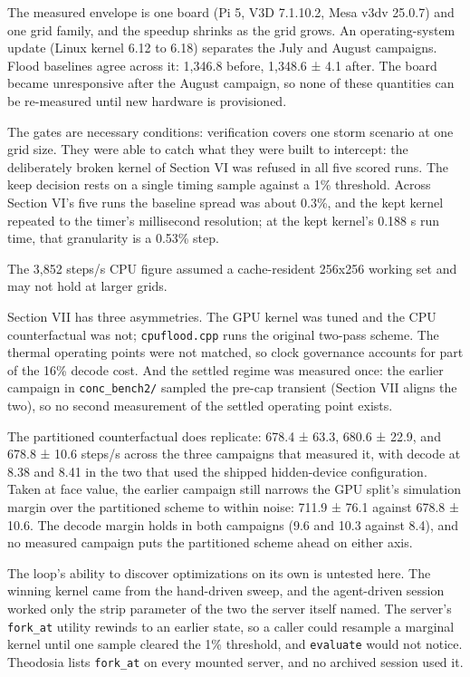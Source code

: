 \documentclass[conference]{IEEEtran}
\begin{document}
The measured envelope is one board (Pi 5, V3D 7.1.10.2, Mesa v3dv
25.0.7) and one grid family, and the speedup shrinks as the grid grows.
An operating-system update (Linux kernel 6.12 to 6.18) separates the
July and August campaigns. Flood baselines agree across it: 1,346.8
before, 1,348.6 ± 4.1 after. The board became unresponsive after the
August campaign, so none of these quantities can be re-measured until
new hardware is provisioned.

The gates are necessary conditions: verification covers one storm
scenario at one grid size. They were able to catch what they were built
to intercept: the deliberately broken kernel of Section VI was refused
in all five scored runs. The keep decision rests on a single timing
sample against a 1\% threshold. Across Section VI's five runs the
baseline spread was about 0.3\%, and the kept kernel repeated to the
timer's millisecond resolution; at the kept kernel's 0.188 s run time,
that granularity is a 0.53\% step.

The 3,852 steps/s CPU figure assumed a cache-resident 256x256 working
set and may not hold at larger grids.

Section VII has three asymmetries. The GPU kernel was tuned and the CPU
counterfactual was not; \texttt{cpuflood.cpp} runs the original two-pass
scheme. The thermal operating points were not matched, so clock
governance accounts for part of the 16\% decode cost. And the settled
regime was measured once: the earlier campaign in \texttt{conc\_bench2/}
sampled the pre-cap transient (Section VII aligns the two), so no second
measurement of the settled operating point exists.

The partitioned counterfactual does replicate: 678.4 ± 63.3, 680.6 ±
22.9, and 678.8 ± 10.6 steps/s across the three campaigns that measured
it, with decode at 8.38 and 8.41 in the two that used the shipped
hidden-device configuration. Taken at face value, the earlier campaign
still narrows the GPU split's simulation margin over the partitioned
scheme to within noise: 711.9 ± 76.1 against 678.8 ± 10.6. The decode
margin holds in both campaigns (9.6 and 10.3 against 8.4), and no
measured campaign puts the partitioned scheme ahead on either axis.

The loop's ability to discover optimizations on its own is untested
here. The winning kernel came from the hand-driven sweep, and the
agent-driven session worked only the strip parameter of the two the
server itself named. The server's \texttt{fork\_at} utility rewinds to
an earlier state, so a caller could resample a marginal kernel until one
sample cleared the 1\% threshold, and \texttt{evaluate} would not
notice. Theodosia lists \texttt{fork\_at} on every mounted server, and
no archived session used it.
\end{document}
